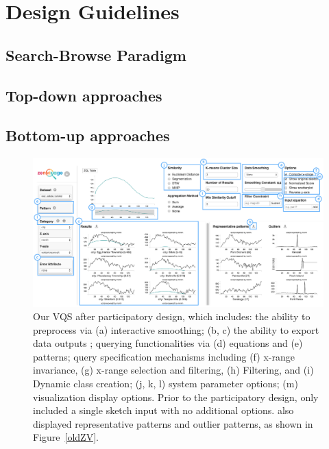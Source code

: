 \section{Design Guidelines\label{sec:guidelines}}
\subsection{Search-Browse Paradigm}
\subsection{Top-down approaches}
\subsection{Bottom-up approaches}

\begin{figure}[ht!]
\centering
\vspace{-15pt}
\includegraphics[width=\linewidth]{figures/newZV.pdf} %
\vspace{-5pt}\caption{Our VQS after participatory design, which includes: the ability to preprocess via (a) interactive smoothing; (b, c) the ability to export data outputs ; querying functionalities via (d) equations and (e) patterns; query specification mechanisms including (f) x-range invariance, (g) x-range selection and filtering, (h) Filtering, and (i) Dynamic class creation; (j, k, l) system parameter options; (m) visualization display options. Prior to the participatory design, \zv only included a single sketch input with no additional options. \zv also displayed representative patterns and outlier patterns, as shown in Figure~\ref{oldZV}.}
\label{zvOverview}
\vspace{-14pt}
\end{figure}
